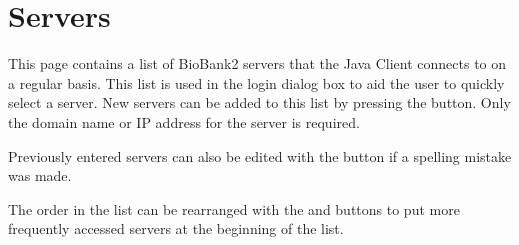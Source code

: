 \section{Servers}
This page contains a list of BioBank2 servers that the Java Client connects to
on a regular basis. This list is used in the login dialog box to aid the user
to quickly select a server. New servers can be added to this list by pressing
the  button. Only the domain name or IP address for the server is
required.

Previously entered servers can also be edited with the  button if a
spelling mistake was made.

The order in the list can be rearranged with the  and 
buttons to put more frequently accessed servers at the beginning of the list.


